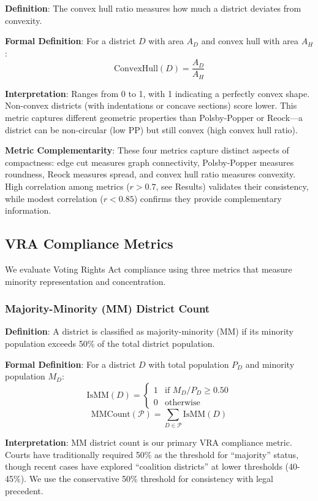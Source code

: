 \textbf{Definition}: The convex hull ratio measures how much a district deviates from convexity.

\textbf{Formal Definition}: For a district $D$ with area $A_D$ and convex hull with area $A_H$:
\[
\text{ConvexHull}(D) = \frac{A_D}{A_H}
\]

\textbf{Interpretation}: Ranges from 0 to 1, with 1 indicating a perfectly convex shape. Non-convex districts (with indentations or concave sections) score lower. This metric captures different geometric properties than Polsby-Popper or Reock---a district can be non-circular (low PP) but still convex (high convex hull ratio).

\textbf{Metric Complementarity}: These four metrics capture distinct aspects of compactness: edge cut measures graph connectivity, Polsby-Popper measures roundness, Reock measures spread, and convex hull ratio measures convexity. High correlation among metrics ($r > 0.7$, see Results) validates their consistency, while modest correlation ($r < 0.85$) confirms they provide complementary information.

\subsection{VRA Compliance Metrics}

We evaluate Voting Rights Act compliance using three metrics that measure minority representation and concentration.

\subsubsection{Majority-Minority (MM) District Count}

\textbf{Definition}: A district is classified as majority-minority (MM) if its minority population exceeds 50\% of the total district population.

\textbf{Formal Definition}: For a district $D$ with total population $P_D$ and minority population $M_D$:
\[
\text{IsMM}(D) = \begin{cases}
1 & \text{if } M_D / P_D \geq 0.50 \\
0 & \text{otherwise}
\end{cases}
\]
\[
\text{MMCount}(\mathcal{P}) = \sum_{D \in \mathcal{P}} \text{IsMM}(D)
\]

\textbf{Interpretation}: MM district count is our primary VRA compliance metric. Courts have traditionally required 50\% as the threshold for ``majority'' status, though recent cases have explored ``coalition districts'' at lower thresholds (40-45\%). We use the conservative 50\% threshold for consistency with legal precedent.

